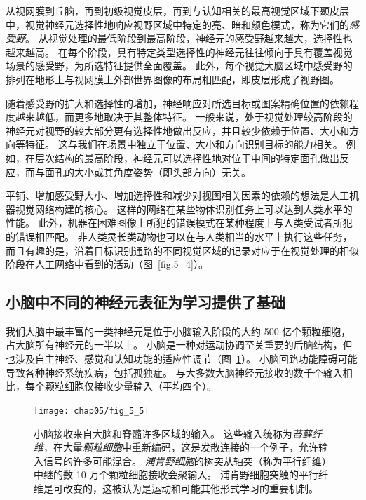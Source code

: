 从视网膜到丘脑，再到初级视觉皮层，再到与认知相关的最高视觉区域下颞皮层中，视觉神经元选择性地响应视野区域中特定的亮、暗和颜色模式，称为它们的\textit{感受野}。
从视觉处理的最低阶段到最高阶段，神经元的感受野越来越大，选择性也越来越高。
在每个阶段，具有特定类型选择性的神经元往往倾向于具有覆盖视觉场景的感受野，为所选特征提供全面覆盖。
此外，每个视觉大脑区域中感受野的排列在地形上与视网膜上外部世界图像的布局相匹配，即皮层形成了视野图。


随着感受野的扩大和选择性的增加，神经响应对所选目标或图案精确位置的依赖程度越来越低，而更多地取决于其整体特征。
一般来说，处于视觉处理较高阶段的神经元对视野的较大部分更有选择性地做出反应，并且较少依赖于位置、大小和方向等特征。
这与我们在场景中独立于位置、大小和方向识别目标的能力相关。
例如，在层次结构的最高阶段，神经元可以选择性地对位于中间的特定面孔做出反应，而与面孔的大小或其角度姿势（即头部方向）无关。


平铺、增加感受野大小、增加选择性和减少对视图相关因素的依赖的想法是人工机器视觉网络构建的核心。
这样的网络在某些物体识别任务上可以达到人类水平的性能。
此外，机器在困难图像上所犯的错误模式在某种程度上与人类受试者所犯的错误相匹配。
非人类灵长类动物也可以在与人类相当的水平上执行这些任务，而且有趣的是，沿着目标识别通路的不同视觉区域的记录对应于在视觉处理的相似阶段在人工网络中看到的活动（图~\ref{fig:5_4}）。



\subsection{小脑中不同的神经元表征为学习提供了基础}

我们大脑中最丰富的一类神经元是位于小脑输入阶段的大约 500 亿个颗粒细胞，占大脑所有神经元的一半以上。 
小脑是一种对运动协调至关重要的后脑结构，但也涉及自主神经、感觉和认知功能的适应性调节（图~\ref{fig:5_5}）。
小脑回路功能障碍可能导致各种神经系统疾病，包括孤独症。
与大多数大脑神经元接收的数千个输入相比，每个颗粒细胞仅接收少量输入（平均四个）。


\begin{figure}[htbp]
	\centering
	\texttt{[image: chap05/fig\_5\_5]}
	\caption{小脑接收来自大脑和脊髓许多区域的输入。
		这些输入统称为\textit{苔藓纤维}，在大量\textit{颗粒细胞}中重新编码，这是发散连接的一个例子，允许输入信号的许多可能混合。
		\textit{浦肯野细胞}的树突从轴突（称为平行纤维）中继的数 10 万个颗粒细胞接收会聚输入。
		浦肯野细胞突触的平行纤维是可改变的，这被认为是运动和可能其他形式学习的重要机制。}
	\label{fig:5_5}
\end{figure}


